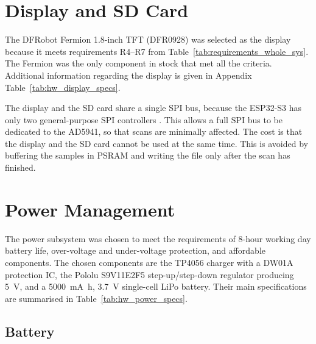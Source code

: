 \section{Display and SD Card}
\label{sec:hw_display}

The DFRobot Fermion 1.8-inch TFT (DFR0928) was selected as the display because it meets requirements R4–R7 from Table~\ref{tab:requirements_whole_sys}. The Fermion was the only component in stock that met all the criteria. Additional information regarding the display is given in Appendix Table~\ref{tab:hw_display_specs}.

The display and the SD card share a single SPI bus, because the ESP32-S3 has only two general-purpose SPI controllers \cite{esp32s3_wroom2_ds}. This allows a full SPI bus to be dedicated to the AD5941, so that scans are minimally affected. The cost is that the display and the SD card cannot be used at the same time. This is avoided by buffering the samples in PSRAM and writing the file
only after the scan has finished.

\section{Power Management}
\label{sec:hw_power}

The power subsystem was chosen to meet the requirements of 8-hour working day battery
life, over-voltage and under-voltage protection, and affordable components.
The chosen components are the TP4056 charger with a DW01A protection IC, the
Pololu S9V11E2F5 step-up/step-down regulator producing \SI{5}{\volt}, and a
\SI{5000}{\milli\ampere\hour}, \SI{3.7}{\volt} single-cell LiPo battery. Their
main specifications are summarised in Table~\ref{tab:hw_power_specs}.

\subsection{Battery}
\label{sec:hw_battery}

